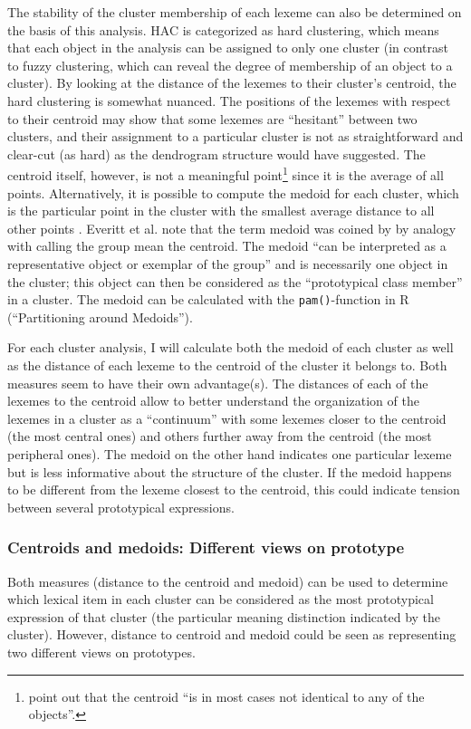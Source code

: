The stability of the cluster membership of each lexeme can also be determined on the basis of this analysis. HAC is categorized as hard clustering, which means that each object in the analysis can be assigned to only one cluster (in contrast to fuzzy clustering, which can reveal the degree of membership of an object to a cluster). By looking at the distance of the lexemes to their cluster’s centroid, the hard clustering is somewhat nuanced. The positions of the lexemes with respect to their centroid may show that some lexemes are ``hesitant'' between two clusters, and their assignment to a particular cluster is not as straightforward and clear-cut (as hard) as the dendrogram structure would have suggested. The centroid itself, however, is not a meaningful point\footnote{\citet[516]{manning_foundations_1999} point out that the centroid “is in most cases not identical to any of the objects”.} since it is the average of all points. Alternatively, it is possible to compute the medoid for each cluster, which is the particular point in the cluster with the smallest average distance to all other points \citep[164]{divjak_structuring_2010}. Everitt et al. \citep[113]{everitt_cluster_2011} note that the term medoid was coined by \citet{kaufman_finding_1990} by analogy with calling the group mean the centroid. The medoid “can be interpreted as a representative object or exemplar of the group” \citep[113]{everitt_cluster_2011} and is necessarily one object in the cluster; this object can then be considered as the “prototypical class member” \citep[516]{manning_foundations_1999} in a cluster. The medoid can be calculated with the \texttt{pam()}-function in R (``Partitioning around Medoids'').

For each cluster analysis, I will calculate both the medoid of each cluster as well as the distance of each lexeme to the centroid of the cluster it belongs to. Both measures seem to have their own advantage(s). The distances of each of the lexemes to the centroid allow to better understand the organization of the lexemes in a cluster as a ``continuum'' with some lexemes closer to the centroid (the most central ones) and others further away from the centroid (the most peripheral ones). The medoid on the other hand indicates one particular lexeme but is less informative about the structure of the cluster. If the medoid happens to be different from the lexeme closest to the centroid, this could indicate tension between several prototypical expressions.

\subsubsection{Centroids and medoids: Different views on prototype}
\label{sec:3.8.1.3}
Both measures (distance to the centroid and medoid) can be used to determine which lexical item in each cluster can be considered as the most prototypical expression of that cluster (the particular meaning distinction indicated by the cluster). However, distance to centroid and medoid could be seen as representing two different views on prototypes.

